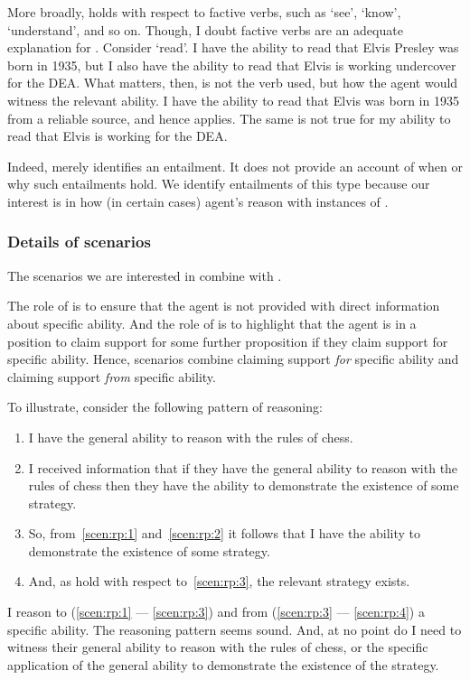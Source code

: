 \begin{note}
  More broadly,  holds with respect to factive verbs, such as `see', `know', `understand', and so on.
  Though, I doubt factive verbs are an adequate explanation for .
  Consider `read'.
  I have the ability to read that Elvis Presley was born in 1935, but I also have the ability to read that Elvis is working undercover for the DEA.
  What matters, then, is not the verb used, but how the agent would witness the relevant ability.
  I have the ability to read that Elvis was born in 1935 from a reliable source, and hence  applies.
  The same is not true for my ability to read that Elvis is working for the DEA.

  Indeed,  merely identifies an entailment.
  It does not provide an account of when or why such entailments hold.
  We identify entailments of this type because our interest is in how (in certain cases) agent's reason with instances of .
\end{note}

\subsubsection{Details of scenarios}
\label{sec:scenarios}

\begin{note}
  The scenarios we are interested in combine \gsi{} with .

  The role of \gsi{} is to ensure that the agent is not provided with direct information about specific ability.
  And the role of  is to highlight that the agent is in a position to claim support for some further proposition if they claim support for specific ability.
  Hence, scenarios combine claiming support \emph{for} specific ability and claiming support \emph{from} specific ability.

  To illustrate, consider the following pattern of reasoning:
  \begin{enumerate}[label=\arabic*., ref=(\arabic*)]
  \item\label{scen:rp:1} I have the general ability to reason with the rules of chess.
  \item\label{scen:rp:2} I received \gsi{} information that if they have the general ability to reason with the rules of chess then they have the ability to demonstrate the existence of some strategy.
  \item\label{scen:rp:3} So, from~\ref{scen:rp:1} and~\ref{scen:rp:2} it follows that I have the ability to demonstrate the existence of some strategy.
  \item\label{scen:rp:4} And, as  hold with respect to~\ref{scen:rp:3}, the relevant strategy exists.
  \end{enumerate}
  I reason to (\ref{scen:rp:1} --- \ref{scen:rp:3}) and from (\ref{scen:rp:3} --- \ref{scen:rp:4}) a specific ability.
  The reasoning pattern seems sound.
  And, at no point do I need to witness their general ability to reason with the rules of chess, or the specific application of the general ability to demonstrate the existence of the strategy.
\end{note}

